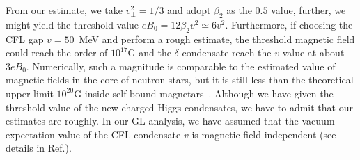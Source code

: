 \documentclass[prd, showpacs,nofootinbib,amsmath,amssymb]{revtex4}
\begin{document}
From our estimate, we take $v_\perp^2=1/3$ and adopt $\beta_2$ as
the $0.5$ value, further, we might yield the threshold value $eB_0 = 12\beta_2 v^2 \simeq 6v^2$.
Furthermore, if choosing the CFL gap $v = 50$~MeV and perform a rough estimate, the threshold magnetic field could reach the
order of $10^{17}\text{G}$ and the $\delta$ condensate reach the $v$ value at about $3eB_0$. Numerically, such a magnitude is comparable to the estimated value of
magnetic fields in the core of neutron stars, but it is still less than the theoretical upper
limit $10^{20}\text{G}$ inside self-bound magnetars~\cite{dong2001,lai1991cold}.
Although we have given the threshold value of the new charged Higgs condensates,
we have to admit that our estimates are roughly.
In our GL analysis, we have assumed that the vacuum expectation value of the CFL condensate $v$ is magnetic field independent 
(see details in Ref.\cite{ferrer2006color}).




\end{document}
